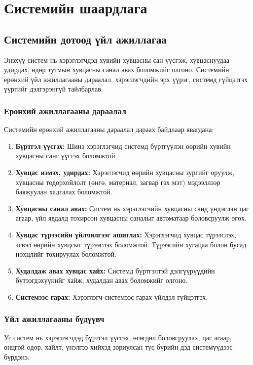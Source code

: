 \chapter{Системийн шаардлага}
\label{chapter3}
\section{Системийн дотоод үйл ажиллагаа}
Энэхүү систем нь хэрэглэгчдэд хувийн хувцасны сан үүсгэж, хувцаснуудаа удирдах, өдөр тутмын хувцасны санал авах боломжийг олгоно. Системийн ерөнхий үйл ажиллагааны дараалал, хэрэглэгчдийн эрх үүрэг, системд гүйцэтгэх үүргийг дэлгэрэнгүй тайлбарлав.

\subsection{Ерөнхий ажиллагааны дараалал}
Системийн ерөнхий ажиллагааны дараалал дараах байдлаар явагдана:
\begin{enumerate}
    \item \textbf{Бүртгэл үүсгэх:} Шинэ хэрэглэгчид системд бүртгүүлэн өөрийн хувийн хувцасны санг үүсгэх боломжтой.
    
    \item \textbf{Хувцас нэмэх, удирдах:} Хэрэглэгчид өөрийн хувцасны зургийг оруулж, хувцасны тодорхойлолт (өнгө, материал, загвар гэх мэт) мэдээллээр баяжуулан хадгалах боломжтой.
    
    \item \textbf{Хувцасны санал авах:} Систем нь хэрэглэгчийн хувцасны санд үндэслэн цаг агаар, үйл явдалд тохирсон хувцасны саналыг автоматаар боловсруулж өгөх.
    
    \item \textbf{Хувцас түрээсийн үйлчилгээг ашиглах:} Хэрэглэгчид хувцас түрээслэх, эсвэл өөрийн хувцсыг түрээслэх боломжтой. Түрээсийн хугацаа болон бусад нөхцлийг тохируулах боломжтой.
    
    \item \textbf{Худалдаж авах хувцас хайх:} Системд бүртгэлтэй дэлгүүрүүдийн бүтээгдэхүүнийг хайж, худалдан авах боломжийг олгоно.
    
    \item \textbf{Системээс гарах:} Хэрэглэгч системээс гарах үйлдэл гүйцэтгэх.
\end{enumerate}

\subsection{Үйл ажиллагааны бүдүүвч}
Уг систем нь хэрэглэгчдэд бүртгэл үүсгэх, өгөгдөл боловсруулах, цаг агаар, онцгой өдөр, хайлт, үнэлгээ хийхэд зориулсан тус бүрийн дэд системүүдээс бүрдэнэ.

